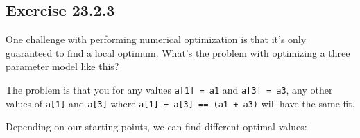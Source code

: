 \documentclass[]{book}
\newenvironment{Shaded}{\begin{snugshade}}{\end{snugshade}}
\newcommand{\CommentTok}[1]{\textcolor[rgb]{0.56,0.35,0.01}{\textit{#1}}}
\newcommand{\ControlFlowTok}[1]{\textcolor[rgb]{0.13,0.29,0.53}{\textbf{#1}}}
\newcommand{\DataTypeTok}[1]{\textcolor[rgb]{0.13,0.29,0.53}{#1}}
\newcommand{\DecValTok}[1]{\textcolor[rgb]{0.00,0.00,0.81}{#1}}
\newcommand{\KeywordTok}[1]{\textcolor[rgb]{0.13,0.29,0.53}{\textbf{#1}}}
\newcommand{\NormalTok}[1]{#1}
\newcommand{\OperatorTok}[1]{\textcolor[rgb]{0.81,0.36,0.00}{\textbf{#1}}}
\newcommand{\StringTok}[1]{\textcolor[rgb]{0.31,0.60,0.02}{#1}}
\theoremstyle{plain}
\theoremstyle{remark}
\theoremstyle{definition}
\theoremstyle{definition}
\theoremstyle{definition}
\theoremstyle{remark}
\begin{document}
\hypertarget{exercise-23.2.3}{%
\subsection*{\texorpdfstring{Exercise
{23.2.3}}{Exercise 23.2.3}}\label{exercise-23.2.3}}

One challenge with performing numerical optimization is that it's only
guaranteed to find a local optimum. What's the problem with optimizing a
three parameter model like this?

\begin{Shaded}
\end{Shaded}

The problem is that you for any values \texttt{a{[}1{]}\ =\ a1} and
\texttt{a{[}3{]}\ =\ a3}, any other values of \texttt{a{[}1{]}} and
\texttt{a{[}3{]}} where \texttt{a{[}1{]}\ +\ a{[}3{]}\ ==\ (a1\ +\ a3)}
will have the same fit.

\begin{Shaded}
\end{Shaded}

Depending on our starting points, we can find different optimal values:

\begin{Shaded}
\end{Shaded}
\end{document}
